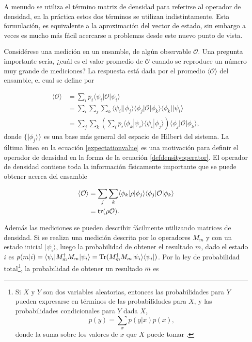  A menudo se utiliza el término matriz de densidad para referirse al operador de densidad, en la práctica estos dos términos se utilizan indistintamente. Esta formulación, es equivalente a la aproximación del vector de estado, sin embargo a veces es mucho más fácil acercarse a problemas desde este nuevo punto de vista.
 
 Considérese una medición en un ensamble, de algún observable $\mathcal{O}$. Una pregunta importante sería, ¿cuál es el valor promedio de $\mathcal{O}$ cuando se reproduce un número muy grande de mediciones? La respuesta está dada por el promedio $\langle \mathcal{O} \rangle$ del ensamble, el cual se define por {\cite{sakurai2017modern}}
 
 \begin{equation}
 	\label{expectationvalue}
 	 \begin{split}
 		\langle \mathcal{O} \rangle &= \sum_{i}p_i \langle\psi_i|\mathcal{O}|\psi_i\rangle\\
 		&=\sum_i\sum_{j}\sum_k \langle\psi_i||\phi_j\rangle \langle \phi_j|\mathcal{O}|\phi_k\rangle \langle \phi_k||\psi_i\rangle\\
 		&=\sum_{j}\sum_k \left(\sum_{i} p_i \langle \phi_k|\psi_i\rangle  \langle\psi_i|\phi_j\rangle\right) \langle \phi_j|\mathcal{O}|\phi_k\rangle, 
 	\end{split}
 \end{equation}
 donde $\{|\phi_j\rangle \}$ es una base más general del espacio de Hilbert del sistema. La última línea en la ecuación {\ref{expectationvalue}} es una motivación para  definir el operador de densidad  en la forma de la ecuación {\ref{defdensityoperator}}. El operador de densidad contiene toda la información físicamente importante que se puede obtener acerca del ensamble {\cite{sakurai2017modern}} 
 
 
 
  \begin{equation}
 	\label{expectationvalue_traza}
 	\begin{split}
 		\langle \mathcal{O} \rangle &=\sum_{j}\sum_k \langle \phi_k|\rho|\phi_j\rangle \langle \phi_j|\mathcal{O}|\phi_k\rangle\\
 		&= \rm{tr}(\rho \mathcal{O}).
 	\end{split}
 \end{equation}

	Además las mediciones se pueden describir fácilmente utilizando matrices de densidad. Si se realiza una medición descrita por lo operadores $M_m$ y con un estado inicial $|\psi_i\rangle$, luego la probabilidad de obtener el resultado $m$, dado el estado $i$ es $p(m|i)=\langle \psi_i|M_m^{\dagger}M_m|\psi_i\rangle = {\rm Tr}(M_m^{\dagger} M_m |\psi_i\rangle \langle\psi_i|)$. Por la ley de probabilidad total\footnote{Si  $X$ y $Y$ son dos variables aleatorias, entonces las probabilidades para $Y $ pueden expresarse en términos de las probabilidades para $X$, y las probabilidades condicionales para $ Y$ dada $X$,
		\[p(y) =\sum_x p(y|x)p(x),\] donde la suma sobre los valores de $x$ que $X$ puede tomar {\cite{nielsen_chuang_2010}}.}, la probabilidad de obtener un resultado $m$ es {\cite{nielsen_chuang_2010}}


